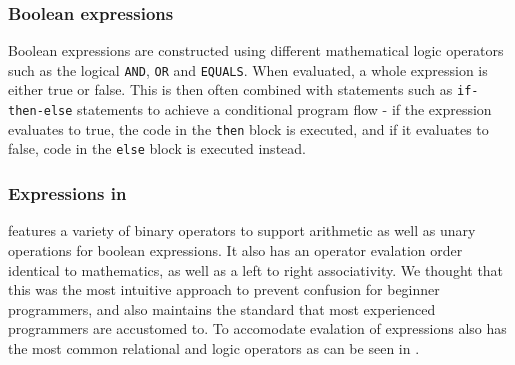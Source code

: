 \subsubsection*{Boolean expressions}
Boolean expressions are constructed using different mathematical logic operators such as the logical \texttt{AND}, \texttt{OR} and \texttt{EQUALS}. 
When evaluated, a whole expression is either true or false. 
This is then often combined with statements such as \texttt{if-then-else} statements to achieve a conditional program flow - if the expression evaluates to true, the code in the \texttt{then} block is executed, and if it evaluates to false, code in the \texttt{else} block is executed instead\cite{sebesta_concepts_2016}.

\subsubsection*{Expressions in \dazel{}}
\dazel{} features a variety of binary operators to support arithmetic as well as unary operations for boolean expressions.
It also has an operator evalation order identical to mathematics, as well as a left to right associativity.  
We thought that this was the most intuitive approach to prevent confusion for beginner programmers, and also maintains the standard that most experienced programmers are accustomed to.
To accomodate evalation of expressions \dazel{} also has the most common relational and logic operators as can be seen in . 

